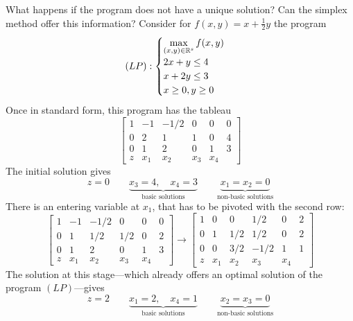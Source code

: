 \begin{example}
What happens if the program does not have a unique solution?  Can the simplex method offer this information? Consider for $f(x,y)=x+\tfrac{1}{2}y$ the program
\begin{equation*}
(LP): \begin{cases} 
\displaystyle{\max_{(x,y)\in\mathbb{R}^s} f(x,y)} \\
2x+y \leq 4 \\
x+2y \leq 3 \\
x \geq 0, y \geq 0
\end{cases}
\end{equation*}
Once in standard form, this program has the tableau
\begin{equation*}
\begin{bmatrix} 
1 & -1  & -1/2 & 0   & 0   & 0 \\
0 & 2   & 1    & 1   & 0   & 4 \\
0 & 1   & 2    & 0   & 1   & 3 \\ \hline
z & x_1 & x_2  & x_3 & x_4
\end{bmatrix}
\end{equation*}
The initial solution gives 
\begin{equation*}
z=0 \qquad \underbrace{x_3=4, \quad x_4=3}_{\text{basic solutions}} \qquad \underbrace{x_1=x_2=0}_{\text{non-basic solutions}}
\end{equation*}
There is an entering variable at $x_1$, that has to be pivoted with the second row:
\begin{equation*}
\begin{bmatrix} 
1 & -1  & -1/2 & 0   & 0   & 0 \\
0 & 1   & 1/2  & 1/2 & 0   & 2 \\
0 & 1   & 2    & 0   & 1   & 3 \\ \hline
z & x_1 & x_2  & x_3 & x_4
\end{bmatrix} \to 
\begin{bmatrix} 
1 & 0   & 0    & 1/2  & 0   & 2 \\
0 & 1   & 1/2  & 1/2  & 0   & 2 \\
0 & 0   & 3/2  & -1/2 & 1   & 1 \\ \hline
z & x_1 & x_2  & x_3  & x_4
\end{bmatrix}
\end{equation*}
The solution at this stage---which already offers an optimal solution of the program $(LP)$---gives
\begin{equation*}
z=2 \qquad \underbrace{x_1=2, \quad x_4=1}_{\text{basic solutions}} \qquad \underbrace{x_2=x_3=0}_{\text{non-basic solutions}}

\end{equation*}
\end{example}
